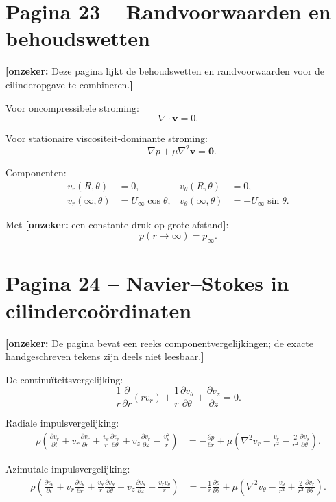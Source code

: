 \documentclass[11pt,a4paper]{article}
\newcommand{\onzeker}[1]{\ifmmode\text{\color{red!70!black}\bfseries[onzeker]}\else\textcolor{red!70!black}{\textbf{[onzeker:} #1\textbf{]}}\fi}
\newcommand{\p}{\partial}
\newcommand{\diver}{\nabla\cdot}
\newcommand{\grad}{\nabla}
\begin{document}
\section*{Pagina 23 -- Randvoorwaarden en behoudswetten}

\onzeker{Deze pagina lijkt de behoudswetten en randvoorwaarden voor de cilinderopgave te combineren.}

Voor oncompressibele stroming:
\[
    \diver \mathbf{v}=0 .
\]

Voor stationaire viscositeit-dominante stroming:
\[
    -\grad p+\mu \nabla^2\mathbf{v}=\mathbf{0}.
\]

Componenten:
\begin{align*}
    v_r(R,\theta)&=0, &
    v_\theta(R,\theta)&=0,\\
    v_r(\infty,\theta)&=U_\infty\cos\theta, &
    v_\theta(\infty,\theta)&=-U_\infty\sin\theta.
\end{align*}

Met \onzeker{een constante druk op grote afstand}:
\[
    p(r\to\infty)=p_\infty .
\]

\section*{Pagina 24 -- Navier--Stokes in cilindercoördinaten}

\onzeker{De pagina bevat een reeks componentvergelijkingen; de exacte handgeschreven tekens zijn deels niet leesbaar.}

De continuïteitsvergelijking:
\[
    \frac{1}{r}\frac{\p}{\p r}\left(r v_r\right)
    +
    \frac{1}{r}\frac{\p v_\theta}{\p\theta}
    +
    \frac{\p v_z}{\p z}
    =
    0 .
\]

Radiale impulsvergelijking:
\begin{align*}
\rho\left(
    \frac{\p v_r}{\p t}
    +
    v_r\frac{\p v_r}{\p r}
    +
    \frac{v_\theta}{r}\frac{\p v_r}{\p\theta}
    +
    v_z\frac{\p v_r}{\p z}
    -
    \frac{v_\theta^2}{r}
\right)
&=
-\frac{\p p}{\p r}
+
\mu\left(
\nabla^2 v_r
-
\frac{v_r}{r^2}
-
\frac{2}{r^2}\frac{\p v_\theta}{\p\theta}
\right).
\end{align*}

Azimutale impulsvergelijking:
\begin{align*}
\rho\left(
    \frac{\p v_\theta}{\p t}
    +
    v_r\frac{\p v_\theta}{\p r}
    +
    \frac{v_\theta}{r}\frac{\p v_\theta}{\p\theta}
    +
    v_z\frac{\p v_\theta}{\p z}
    +
    \frac{v_r v_\theta}{r}
\right)
&=
-\frac{1}{r}\frac{\p p}{\p\theta}
+
\mu\left(
\nabla^2 v_\theta
-
\frac{v_\theta}{r^2}
+
\frac{2}{r^2}\frac{\p v_r}{\p\theta}
\right).
\end{align*}
\end{document}
